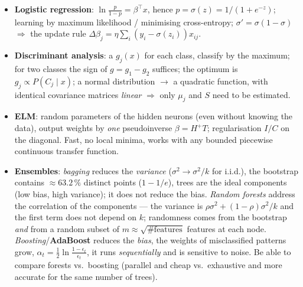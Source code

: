 \documentclass[11pt,a4paper]{article}
\theoremstyle{definition}
\begin{document}
\begin{itemize}
      Only 2 classes, only a real-valued space, not interpretable.
\item \textbf{Logistic regression}: $\ln\frac{p}{1-p}=\beta^{\!\top}x$, hence
      $p=\sigma(z)=1/(1+e^{-z})$; learning by maximum likelihood / minimising cross-entropy;
      $\sigma'=\sigma(1-\sigma)$ $\Rightarrow$ the update rule
      $\Delta\beta_j=\eta\sum_i(y_i-\sigma(z_i))x_{ij}$.
\item \textbf{Discriminant analysis}: a $g_j(x)$ for each class, classify by the maximum; for two
      classes the sign of $g=g_1-g_2$ suffices; the optimum is $g_j\propto P(C_j\mid x)$; a normal
      distribution $\to$ a quadratic function, with identical covariance matrices \emph{linear}
      $\Rightarrow$ only $\mu_j$ and $S$ need to be estimated.
\item \textbf{ELM}: random parameters of the hidden neurons (even without knowing the data), output
      weights by \emph{one} pseudoinverse $\beta=H^{+}T$; regularisation $I/C$ on the diagonal.
      Fast, no local minima, works with any bounded piecewise continuous transfer function.
\item \textbf{Ensembles}: \emph{bagging} reduces the \emph{variance} ($\sigma^2\to\sigma^2/k$ for
      i.i.d.), the bootstrap contains $\approx 63.2\,\%$ distinct points ($1-1/e$), trees are the
      ideal components (low bias, high variance); it does not reduce the bias. \emph{Random
      forests} address the correlation of the components --- the variance is
      $\rho\sigma^2+(1-\rho)\sigma^2/k$ and the first term does not depend on $k$; randomness comes
      from the bootstrap \emph{and} from a random subset of $m\approx\sqrt{\#\text{features}}$
      features at each node. \emph{Boosting}/\textbf{AdaBoost} reduces the \emph{bias}, the weights
      of misclassified patterns grow, $\alpha_t=\frac12\ln\frac{1-\epsilon_t}{\epsilon_t}$, it runs
      \emph{sequentially} and is sensitive to noise. Be able to compare forests vs.\ boosting
      (parallel and cheap vs.\ exhaustive and more accurate for the same number of trees).
\end{itemize}
\end{document}
